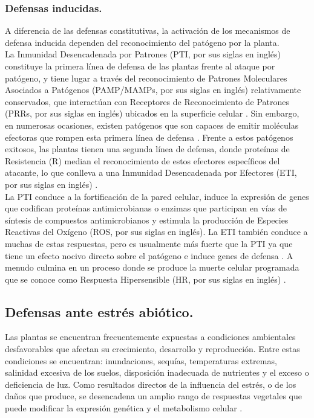 \subsubsection{Defensas inducidas.}

A diferencia de las defensas constitutivas, la activaci\'on de los mecanismos de defensa inducida dependen del reconocimiento del pat\'ogeno por la planta.\\ 

La Inmunidad Desencadenada por Patrones (PTI, por sus siglas en ingl\'es) constituye la primera línea de defensa de las plantas frente al ataque por patógeno, y tiene lugar a través del reconocimiento de Patrones Moleculares Asociados a Patógenos (PAMP/MAMPs, por sus siglas en ingl\'es) relativamente conservados, que interact\'uan con  Receptores de Reconocimiento de Patrones (PRRs, por sus siglas en ingl\'es) ubicados en la superficie celular \citep{trda2015perception}. Sin embargo, en numerosas ocasiones, existen patógenos que son capaces de emitir moléculas efectoras que rompen esta primera línea de defensa \citep{de2010conserved, bardoel2011molecular}. Frente a estos patógenos exitosos, las plantas tienen una segunda línea de defensa, donde proteínas de Resistencia (R) median el reconocimiento de estos efectores específicos del atacante, lo que conlleva a una Inmunidad Desencadenada por Efectores (ETI, por sus siglas en inglés) \citep{pieterse2009networking}.\\

La PTI conduce a la fortificación de la pared celular, induce la expresión de genes que codifican proteínas antimicrobianas o enzimas que participan en vías de síntesis de compuestos antimicrobianos y estimula la producción de Especies Reactivas del Oxígeno (ROS, por sus siglas en inglés). La ETI también conduce a muchas de estas respuestas, pero es usualmente más fuerte que la PTI ya que tiene un efecto nocivo directo sobre el patógeno e induce genes de defensa \citep{grant2000role}. A menudo culmina en un proceso donde se produce la muerte celular programada que se conoce como Respuesta Hipersensible (HR, por sus siglas en inglés) \citep{taiz2017fisiologia}. \\

\subsection{Defensas ante estr\'es abi\'otico.}

Las plantas se encuentran frecuentemente expuestas a condiciones ambientales desfavorables que afectan su crecimiento, desarrollo y reproducci\'on. Entre estas condiciones se encuentran: inundaciones, sequ\'ias, temperaturas extremas, salinidad excesiva de los suelos, disposici\'on inadecuada de nutrientes y el exceso o deficiencia de luz. Como resultados directos de la influencia del estr\'es, o de los da\~nos que produce, se desencadena un amplio rango de respuestas vegetales que puede modificar la expresi\'on gen\'etica y el metabolismo celular \citep{buchanan2015biochemistry}. \\

